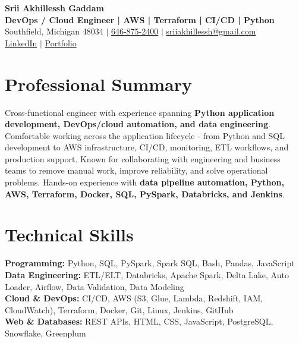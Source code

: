 \documentclass[letterpaper,10pt]{article}
\begin{document}
\fontsize{9.35pt}{10.45pt}\selectfont

\begin{center}
    {\LARGE \textbf{Srii Akhillessh Gaddam}} \\[-1pt]
    \textbf{DevOps / Cloud Engineer | AWS | Terraform | CI/CD | Python} \\[2pt]
    Southfield, Michigan 48034 $|$
    \href{tel:6468752400}{646-875-2400} $|$
    \href{mailto:sriiakhillessh@gmail.com}{sriiakhillessh@gmail.com} \\[1pt]
    \href{https://www.linkedin.com/in/srii-akhiilessh-gaddam-b48668191/}{LinkedIn} $|$
    \href{https://sriiakhillesshg.github.io/portfolio/}{Portfolio}
\end{center}
\vspace{-8pt}

\section{Professional Summary}
\small{Cross-functional engineer with experience spanning \textbf{Python application development, DevOps/cloud automation, and data engineering}. Comfortable working across the application lifecycle - from Python and SQL development to AWS infrastructure, CI/CD, monitoring, ETL workflows, and production support. Known for collaborating with engineering and business teams to remove manual work, improve reliability, and solve operational problems. Hands-on experience with \textbf{data pipeline automation, Python, AWS, Terraform, Docker, SQL, PySpark, Databricks, and Jenkins}.}

\section{Technical Skills}
\small{
\textbf{Programming:} Python, SQL, PySpark, Spark SQL, Bash, Pandas, JavaScript \\
\textbf{Data Engineering:} ETL/ELT, Databricks, Apache Spark, Delta Lake, Auto Loader, Airflow, Data Validation, Data Modeling \\
\textbf{Cloud \& DevOps:} CI/CD, AWS (S3, Glue, Lambda, Redshift, IAM, CloudWatch), Terraform, Docker, Git, Linux, Jenkins, GitHub \\
\textbf{Web \& Databases:} REST APIs, HTML, CSS, JavaScript, PostgreSQL, Snowflake, Greenplum
}
\end{document}
